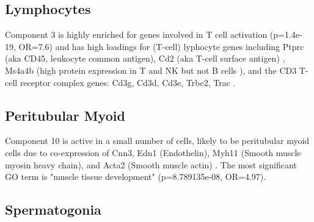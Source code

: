 \subsection{Lymphocytes}
Component 3 is highly enriched for genes involved in T cell activation (p=1.4e-19, OR=7.6) and has high loadings for (T-cell) lyphocyte genes including Ptprc (aka CD45, leukocyte common antigen), Cd2 (aka T-cell surface antigen) \parencite{Murray2011Protective, Murphy2012Janeway}, Ms4a4b (high protein expression in T and NK but not B cells \cite{Xu2010MS4a4B}), and the CD3 T-cell receptor complex genes: Cd3g, Cd3d, Cd3e, Trbc2, Trac \parencite{Call2002Organizing}.


\subsection{Peritubular Myoid}

Component 10 is active in a small number of cells, likely to be peritubular myoid cells due to co-expression of Cnn3, Edn1 (Endothelin), Myh11 (Smooth muscle myosin heavy chain), and Acta2 (Smooth muscle actin) \parencite{Mayerhofer2013Human}. The most significant GO term is "muscle tissue development" (p=8.789135e-08, OR=4.97).





\subsection{Spermatogonia}


